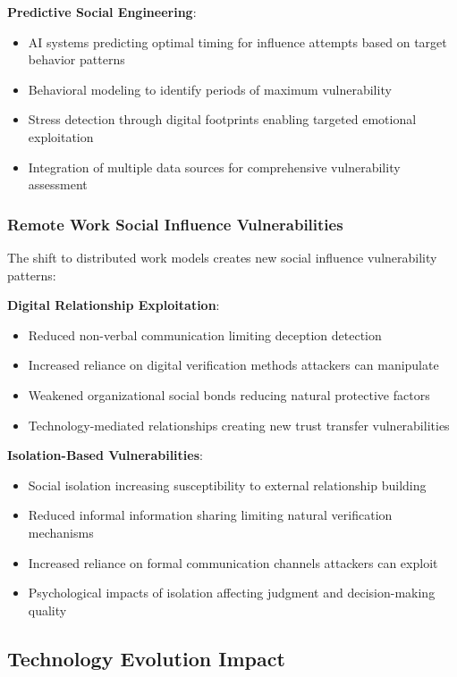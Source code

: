 \documentclass[11pt,a4paper]{article}
\begin{document}
\textbf{Predictive Social Engineering}:
\begin{itemize}
\item AI systems predicting optimal timing for influence attempts based on target behavior patterns
\item Behavioral modeling to identify periods of maximum vulnerability
\item Stress detection through digital footprints enabling targeted emotional exploitation
\item Integration of multiple data sources for comprehensive vulnerability assessment
\end{itemize}

\subsubsection{Remote Work Social Influence Vulnerabilities}

The shift to distributed work models creates new social influence vulnerability patterns:

\textbf{Digital Relationship Exploitation}:
\begin{itemize}
\item Reduced non-verbal communication limiting deception detection
\item Increased reliance on digital verification methods attackers can manipulate
\item Weakened organizational social bonds reducing natural protective factors
\item Technology-mediated relationships creating new trust transfer vulnerabilities
\end{itemize}

\textbf{Isolation-Based Vulnerabilities}:
\begin{itemize}
\item Social isolation increasing susceptibility to external relationship building
\item Reduced informal information sharing limiting natural verification mechanisms
\item Increased reliance on formal communication channels attackers can exploit
\item Psychological impacts of isolation affecting judgment and decision-making quality
\end{itemize}

\subsection{Technology Evolution Impact}
\end{document}
